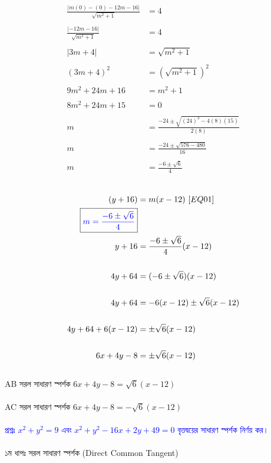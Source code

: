 \documentclass{article}
\begin{document}
	\begin{align*}
		\frac{|m(0)-(0)-12m-16|}{\sqrt{m^2+1}}&=4\\
		\\
		\frac{|-12m-16|}{\sqrt{m^2+1}}&=4\\
		\\
		|3m+4|&=\sqrt{m^2+1}\\
		\\
		(3m+4)^2&=(\sqrt{m^2+1})^2\\
		\\
		9m^2+24m+16&=m^2+1\\
		\\
		8m^2+24m+15&=0\\
		\\
		m&=\frac{-24\pm\sqrt{(24)^2-4(8)(15)}}{2(8)}\\
		\\
		m&=\frac{-24\pm\sqrt{576-480}}{16}\\
		\\
		m&=\frac{-6\pm\sqrt{6}}{4}\\
	\end{align*}
	\\
	\begin{align*}
		(y+16)&=m(x-12)\,\,[EQ01]\\
		\boxed{\textcolor{blue}{m=\frac{-6\pm\sqrt{6}}{4}}}&\\
		y+16&=\frac{-6\pm\sqrt{6}}{4}(x-12)\\
		\\
		4y+64&=(-6\pm\sqrt{6})(x-12)\\
		\\
		4y+64&=-6(x-12)\pm\sqrt{6}(x-12)\\
		\\
		4y+64+6(x-12)&=\pm\sqrt{6}(x-12)\\
		\\
		6x+4y-8&=\pm\sqrt{6}(x-12)\\
	\end{align*}
	\\
AB সরল সাধারণ স্পর্শক $6x+4y-8=\sqrt{6}(x-12)$\\
	\\
AC সরল সাধারণ স্পর্শক $6x+4y-8=-\sqrt{6}(x-12)$\\
\\ 
	\textcolor{blue}{প্রশ্নঃ $x^2+y^2=9$ এবং  $x^2+y^2-16x+2y+49=0$ বৃত্তদ্বয়ের সাধারণ স্পর্শক নির্ণয় কর।}\\
	\\ 
	১ম ধাপঃ সরল সাধারণ স্পর্শক (Direct Common Tangent) \\
\end{document}
